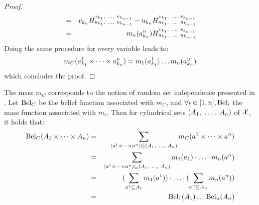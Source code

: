 \begin{proof}
\begin{eqnarray*}
        &=& v_{k_n}H_{u_{k_1} , ~\ldots, ~ u_{k_{n-1}}}^{v_{k_1} , ~\ldots, ~ v_{k_{n-1}}} - u_{k_n}H_{u_{k_1} , ~\ldots, ~ u_{k_{n-1}}}^{v_{k_1} , ~\ldots, ~ v_{k_{n-1}}}\\
        &=& m_{n}(a^{n}_{k_{n}})H_{u_{k_1} , ~\ldots, ~ u_{k_{n-1}}}^{v_{k_1} , ~\ldots, ~ v_{k_{n-1}}}
    \end{eqnarray*}
    Doing the same procedure for every variable leads to:
    \begin{eqnarray*}
        m_C(a^1_{k_1}\times\dots\times a^n_{k_n}) = m_1(a^1_{k_1})\ldots m_n(a^n_{k_n})
    \end{eqnarray*}
    which concludes the proof.
\end{proof}

The mass $m_C$ corresponds to the notion of random set independence presented in \cite{dempster_upper_1967, couso_survey_2000}. Let $\mathrm{Bel}_C$ be the belief function associated with $m_C$, and $\forall i\in[1,n], \mathrm{Bel}_i$ the mass function associated with $m_i$. Then for cylindrical sets $(A_1 , ~\ldots, ~ A_n)$ of $\mathcal{X}$, it holds that:
\begin{eqnarray}
    \mathrm{Bel}_C(A_1\times\dots\times A_n) &=& \sum_{(a^1\times\dots\times a^n)\subseteq (A_1 , ~\ldots, ~ A_n)}m_C(a^1\times\dots\times a^n)\nonumber\\
    &=& \sum_{(a^1\times\dots\times a^n)\subseteq (A_1 , ~\ldots, ~ A_n)}m_1(a_1)\cdot\ldots\cdot m_n(a^n)\nonumber\\
    &=& (\sum_{a^1\subseteq A_1}m_1(a^1))\cdot\ldots\cdot(\sum_{a^n\subseteq A_n}m_n(a^n))\nonumber\\
    &=& \mathrm{Bel}_1(A_1)\ldots \mathrm{Bel}_n(A_n)
\end{eqnarray}

